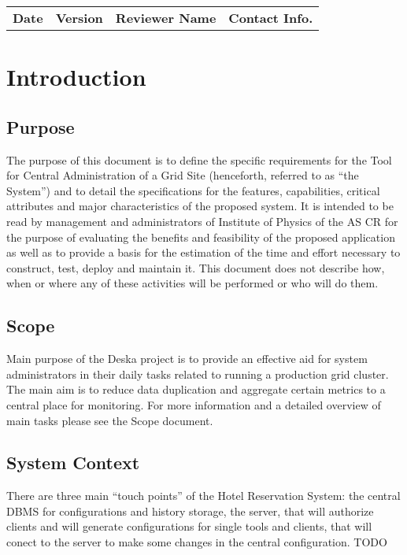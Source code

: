 \documentclass[12pt]{article}
\begin{document}
\begin{table}[!h]
	\begin{tabular}{l l l l}
		\textbf{Date} & \textbf{Version} & \textbf{Reviewer Name} & \textbf{Contact Info.} \\
	\end{tabular}
	\label{tab:DocumentApproval}
\end{table}


\newpage

\tableofcontents

\newpage

\section{Introduction}

\subsection{Purpose}
The purpose of this document is to define the specific requirements for the Tool for Central Administration of a Grid Site 
(henceforth, referred to as ``the System'') and to detail the specifications for the features, capabilities, critical attributes 
and major characteristics of the proposed system. It is intended to be read by management and administrators of Institute of 
Physics of the AS CR for the purpose of evaluating the benefits and feasibility of the proposed application as well as to provide 
a basis for the estimation of the time and effort necessary to construct, test, deploy and maintain it. This document does not 
describe how, when or where any of these activities will be performed or who will do them.

\subsection{Scope}
Main purpose of the Deska project is to provide an effective aid for system
administrators in their daily tasks related to running a production grid
cluster.  The main aim is to reduce data duplication and aggregate certain
metrics to a central place for monitoring.  For more information and a detailed
overview of main tasks please see the Scope document.

\subsection{System Context}
There are three main ``touch points'' of the Hotel Reservation System: the central DBMS for configurations and history storage, the server, 
that will authorize clients and will generate configurations for single tools and clients, that will conect to the server to make some 
changes in the central configuration. TODO
\end{document}

